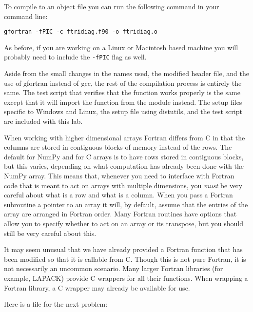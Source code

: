 To compile  to an object file you can run the following command in your command line:
\begin{lstlisting}[style=ShellInput]
gfortran -fPIC -c ftridiag.f90 -o ftridiag.o
\end{lstlisting}
As before, if you are working on a Linux or Macintosh based machine you will probably need to include the \texttt{-fPIC} flag as well.

Aside from the small changes in the names used, the modified header file, and the use of gfortran instead of gcc, the rest of the compilation process is entirely the same.
The test script that verifies that the function works properly is the same except that it will import the function from the module  instead.
The setup files specific to Windows and Linux, the setup file using distutils, and the test script are included with this lab.

\begin{warn}
When working with higher dimensional arrays Fortran differs from C in that the columns are stored in contiguous blocks of memory instead of the rows.
The default for NumPy and for C arrays is to have rows stored in contiguous blocks, but this varies, depending on what computation has already been done with the NumPy array.
This means that, whenever you need to interface with Fortran code that is meant to act on arrays with multiple dimensions, you \emph{must} be very careful about what is a row and what is a column.
When you pass a Fortran subroutine a pointer to an array it will, by default, assume that the entries of the array are arranged in Fortran order.
Many Fortran routines have options that allow you to specify whether to act on an array or its transpose, but you should still be very careful about this.
\end{warn}

\begin{info}
It may seem unusual that we have already provided a Fortran function that has been modified so that it is callable from C.
Though this is not pure Fortran, it is not necessarily an uncommon scenario.
Many larger Fortran libraries (for example, LAPACK) provide C wrappers for all their functions.
When wrapping a Fortran library, a C wrapper may already be available for use.
\end{info}

Here is a file for the next problem:


